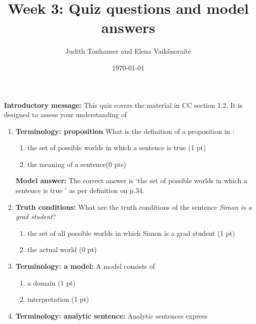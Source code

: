 \documentclass[a4,11pt]{article}
\title{Week 3: Quiz questions and model answers}
\author{Judith Tonhauser and Elena Vaik\v snorait\.{e} }
\date{\today}
\begin{document}
\maketitle

{\bf Introductory message:} This quiz covers the material in CC section 1.2. It is designed to assess your understanding of 


\begin{enumerate}[leftmargin = 12pt]

   \item {\bf Terminology: proposition}  What is the definition of a proposition in :
       \begin{enumerate}[noitemsep]
       \item the set of possible worlds in which a sentence is true (1 pt) 
        \item the meaning of a sentence(0 pts)
   \end{enumerate}
  
     {\bf Model answer:} The correct answer is `the set of possible worlds in which a sentence is true ' as per definition on p.34.

   \item {\bf Truth conditions:}   What are the truth conditions of the sentence \textit{Simon is a grad student}?
       \begin{enumerate}[noitemsep]
       \item the set of all possible worlds in which Simon is a grad student (1 pt)
        \item the actual world (0 pt)
    \end{enumerate}     
        
          \item {\bf Terminology: a model:}   A model consists of
       \begin{enumerate}[noitemsep]
       \item a domain (1 pt)
        \item interpretation (1 pt)
            \end{enumerate}
   
          \item {\bf Terminology: analytic sentence:} Analytic sentences express 
          
   

 
 \end{enumerate}
\end{document}
